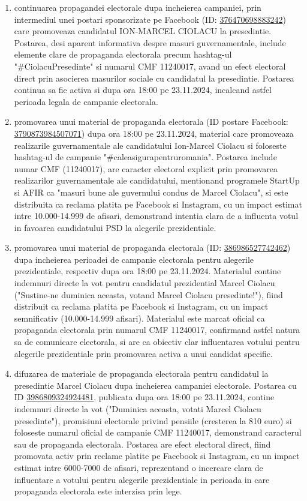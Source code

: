 \documentclass[a4paper,12pt]{article}
\begin{document}
\begin{enumerate}[leftmargin=*, label=\arabic*.)]
    \item continuarea propagandei electorale dupa incheierea campaniei, prin intermediul unei postari sponsorizate pe Facebook (ID: \href{https://www.facebook.com/ads/library/?id=376470698883242}{376470698883242}) care promoveaza candidatul ION-MARCEL CIOLACU la presedintie. Postarea, desi aparent informativa despre masuri guvernamentale, include elemente clare de propaganda electorala precum hashtag-ul "\#CiolacuPresedinte" si numarul CMF 11240017, avand un efect electoral direct prin asocierea masurilor sociale cu candidatul la presedintie. Postarea continua sa fie activa si dupa ora 18:00 pe 23.11.2024, incalcand astfel perioada legala de campanie electorala.
    \item promovarea unui material de propaganda electorala (ID postare Facebook: \href{https://www.facebook.com/ads/library/?id=3790873984507071}{3790873984507071}) dupa ora 18:00 pe 23.11.2024, material care promoveaza realizarile guvernamentale ale candidatului Ion-Marcel Ciolacu si foloseste hashtag-ul de campanie "\#caleasigurapentruromania". Postarea include numar CMF (11240017), are caracter electoral explicit prin promovarea realizarilor guvernamentale ale candidatului, mentionand programele StartUp si AFIR ca "masuri bune ale guvernului condus de Marcel Ciolacu", si este distribuita ca reclama platita pe Facebook si Instagram, cu un impact estimat intre 10.000-14.999 de afisari, demonstrand intentia clara de a influenta votul in favoarea candidatului PSD la alegerile prezidentiale.
    \item promovarea unui material de propaganda electorala (ID: \href{https://www.facebook.com/ads/library/?id=386986527742462}{386986527742462}) dupa incheierea perioadei de campanie electorala pentru alegerile prezidentiale, respectiv dupa ora 18:00 pe 23.11.2024. Materialul contine indemnuri directe la vot pentru candidatul prezidential Marcel Ciolacu ("Sustine-ne duminica aceasta, votand Marcel Ciolacu presedinte!"), fiind distribuit ca reclama platita pe Facebook si Instagram, cu un impact semnificativ (10.000-14.999 afisari). Materialul este marcat oficial ca propaganda electorala prin numarul CMF 11240017, confirmand astfel natura sa de comunicare electorala, si are ca obiectiv clar influentarea votului pentru alegerile prezidentiale prin promovarea activa a unui candidat specific.
    \item difuzarea de materiale de propaganda electorala pentru candidatul la presedintie Marcel Ciolacu dupa incheierea campaniei electorale. Postarea cu ID \href{https://www.facebook.com/ads/library/?id=3986809324924481}{3986809324924481}, publicata dupa ora 18:00 pe 23.11.2024, contine indemnuri directe la vot ("Duminica aceasta, votati Marcel Ciolacu presedinte"), promisiuni electorale privind pensiile (cresterea la 810 euro) si foloseste numarul oficial de campanie CMF 11240017, demonstrand caracterul sau de propaganda electorala. Postarea are efect electoral direct, fiind promovata activ prin reclame platite pe Facebook si Instagram, cu un impact estimat intre 6000-7000 de afisari, reprezentand o incercare clara de influentare a votului pentru alegerile prezidentiale in perioada in care propaganda electorala este interzisa prin lege.

\end{enumerate}
\end{document}
